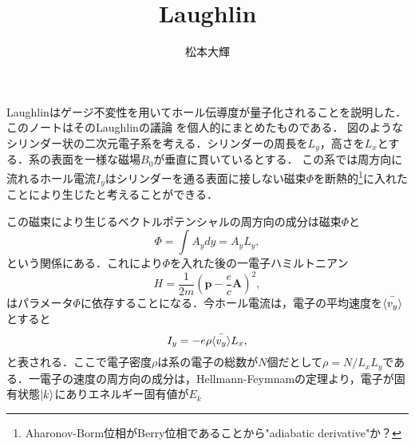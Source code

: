 \documentclass[]{jsarticle}
\title{Laughlin}
\author{松本大輝}
\date{}
\begin{document}
\maketitle
Laughlinはゲージ不変性を用いてホール伝導度が量子化されることを説明した．このノートはそのLaughlinの議論
を個人的にまとめたものである．
図のようなシリンダー状の二次元電子系を考える．シリンダーの周長を$L_y$，高さを$L_x$とする．系の表面を一様な磁場$B_0$が垂直に貫いているとする．
この系では周方向に流れるホール電流$I_y$はシリンダーを通る表面に接しない磁束$\Phi$を断熱的\footnote{Aharonov-Borm位相がBerry位相であることから"adiabatic derivative"か？}に入れたことにより生じたと考えることができる．
\begin{center}
\end{center}
この磁束により生じるベクトルポテンシャルの周方向の成分は磁束$\Phi$と
\begin{equation}
    \Phi = \int A_y dy = A_y L_y,
\end{equation}
という関係にある．これにより$\Phi$を入れた後の一電子ハミルトニアン
\begin{equation}
    H = \frac{1}{2m} \left(\bm{p} - \frac{e}{c}\bm{A} \right)^2,
\end{equation}
はパラメータ$\Phi$に依存することになる．今ホール電流は，電子の平均速度を$\bar{\braket{v_y}}$とすると
\begin{equation}
    I_y = -e\rho\bar{\braket{v_y}}L_x,
\end{equation}
と表される．ここで電子密度$\rho$は系の電子の総数が$N$個だとして$\rho = N/L_xL_y$である．一電子の速度の周方向の成分は，Hellmann-Feymnamの定理より，電子が固有状態$\ket{k}$にありエネルギー固有値が$E_k$
\end{document}
